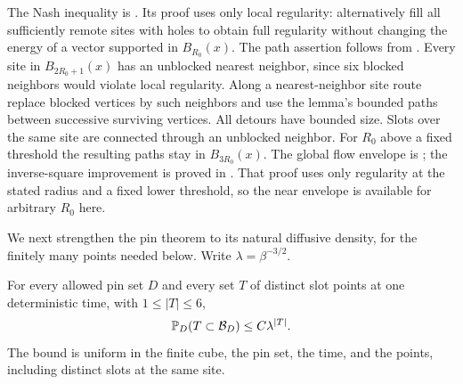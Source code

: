 The Nash inequality is \cite[Proposition~5.6]{Ordering}.  Its proof
uses only local regularity: alternatively fill all sufficiently remote
sites with holes to obtain full regularity without changing the energy
of a vector supported in $B_{R_0}(x)$.  The path assertion follows from
\cite[Lemma~5.5]{Ordering}.  Every site in $B_{2R_0+1}(x)$ has
an unblocked nearest neighbor, since six blocked neighbors would violate
local regularity.
Along a nearest-neighbor site route replace blocked vertices by such
neighbors and use the lemma's bounded paths between successive surviving
vertices.  All detours have bounded size.  Slots over the same site are
connected through an unblocked neighbor.  For $R_0$ above a fixed
threshold the resulting paths stay in $B_{3R_0}(x)$.
The global flow envelope is \cite[Proposition~6.2]{Ordering}; the
inverse-square improvement is proved in
\cite[Lemma~3.6]{BlochLaw}.  That proof uses only regularity at
the stated radius and a fixed lower threshold, so the near envelope is
available for arbitrary $R_0$ here.

We next strengthen the pin theorem to its natural diffusive density,
for the finitely many points needed below.  Write
$\lambda=\beta^{-3/2}$.

\begin{proposition}\label{prop:snapshot}
For every allowed pin set $D$ and every set $T$ of distinct slot points
at one deterministic time, with $1\le |T|\le6$,
\begin{equation}\label{eq:snapshot}
 \mathbb P_D(T\subset\mathcal B_D)\le C\lambda^{|T|}.
\end{equation}
The bound is uniform in the finite cube, the pin set, the time, and the
points, including distinct slots at the same site.
\end{proposition}


